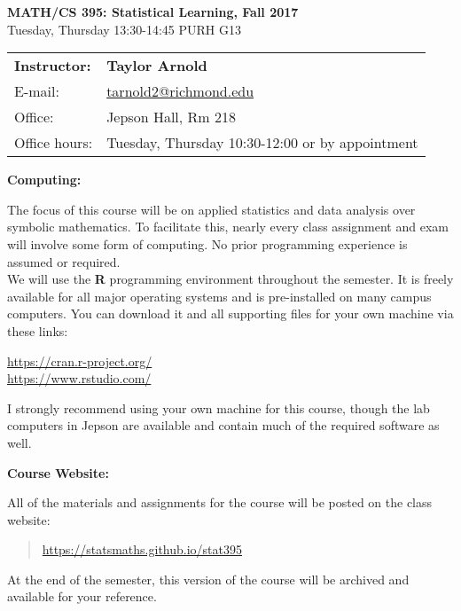 \documentclass[12pt]{article}
\begin{document}
\begin{center}
{\bf MATH/CS 395: Statistical Learning, Fall 2017} \\
Tuesday, Thursday 13:30-14:45 \quad PURH G13\\
\end{center}

\bigskip

\noindent
\begin{tabular}{ l l }
{\bf Instructor:} &  {\bf Taylor Arnold} \\
E-mail: & \href{mailto:tarnold2@richmond.edu}{tarnold2@richmond.edu} \\
Office: & Jepson Hall, Rm 218 \\
Office hours: & Tuesday, Thursday 10:30-12:00 or by appointment
\end{tabular}

\vspace{0.5cm}

\textbf{Computing:} \vspace{6pt}

The focus of this course will be on applied statistics and data analysis
over symbolic mathematics. To facilitate this, nearly every class
assignment and exam will involve some form of computing.
No prior programming experience is assumed or required. \\

We will use the \textbf{R} programming environment throughout the
semester. It is freely available for all major operating systems and
is pre-installed on many campus computers. You can download it and
all supporting files for your own machine via these links:
\begin{center}
\url{https://cran.r-project.org/} \\
\url{https://www.rstudio.com/}
\end{center}
I strongly recommend using your own machine for this course, though
the lab computers in Jepson are available and contain much of the
required software as well.

\vspace{0.4cm}

\textbf{Course Website:} \vspace{6pt}

All of the materials and assignments for the course will be posted
on the class website:
\begin{quote}
\url{https://statsmaths.github.io/stat395}
\end{quote}
At the end of the semester, this version of the course
will be archived and available for your reference.
\end{document}
